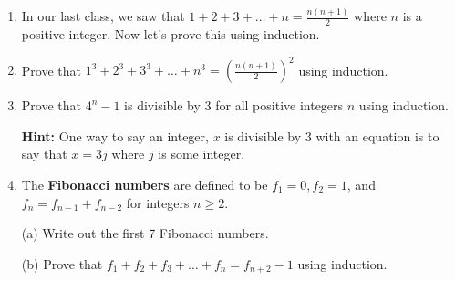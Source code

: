 \documentclass[fleqn]{article}
\theoremstyle{definition}
\begin{document}
\begin{enumerate}

\item In our last class, we saw that $\displaystyle{1+2+3+ \ldots + n = \frac{n(n+1)}{2}}$ where $n$ is a positive integer. Now let's prove this using induction. 

\newpage

\item Prove that $\displaystyle{1^3 + 2^3 + 3^3 + \ldots + n^3 = \left( \frac{n(n+1)}{2} \right)^2}$ using induction.

\newpage 

\item Prove that $4^n-1$ is divisible by $3$ for all positive integers $n$ using induction. 

\vspace{.25cm}
\textbf{Hint:} One way to say an integer, $x$ is divisible by 3 with an equation is to say that $x=3j$ where $j$ is some integer. 


\newpage

\item The \textbf{Fibonacci numbers} are defined to be $f_1=0, f_2=1$, and $f_{n} = f_{n-1} + f_{n-2}$ for integers $n \geq 2$. 

\vspace{.25cm}
(a) Write out the first 7 Fibonacci numbers. 

\vspace{1.5cm}
(b) Prove that $f_1 + f_2 + f_3 + \ldots + f_n = f_{n+2} - 1$ using induction. 



\end{enumerate}
\end{document}
